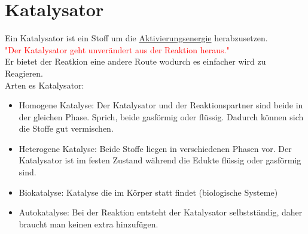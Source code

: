 
\section{Katalysator} \label{sec:katalysator}
Ein Katalysator ist ein Stoff um die \hyperref[sec:aktivierungsenergie]{Aktivierungsenergie} herabzusetzen.  \\
\textcolor{red}{"Der Katalysator geht unverändert aus der Reaktion heraus."} \\
Er bietet der Reatkion eine andere Route wodurch es einfacher wird zu Reagieren.\\
Arten es Katalysator: \\
\begin{itemize}
    \item Homogene Katalyse: 
        Der Katalysator und der Reaktionspartner sind beide in der gleichen Phase. 
        Sprich, beide gasförmig oder flüssig. 
        Dadurch können sich die Stoffe gut vermischen.
    \item Heterogene Katalyse: 
        Beide Stoffe liegen in verschiedenen Phasen vor. 
        Der Katalysator ist im festen Zustand während die Edukte flüssig oder gasförmig sind.
    \item Biokatalyse:
        Katalyse die im Körper statt findet (biologische Systeme)
    \item Autokatalyse: 
        Bei der Reaktion entsteht der Katalysator selbstständig, daher braucht man keinen extra hinzufügen.
\end{itemize}

